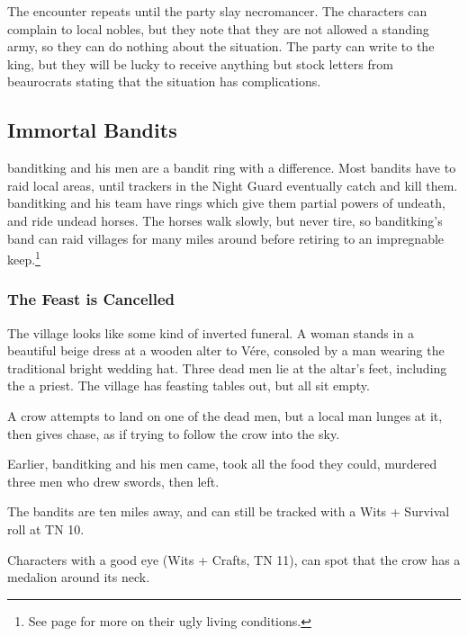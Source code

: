 The encounter repeats until the party slay \gls{necromancer}.  The characters can complain to local nobles, but they note that they are not allowed a standing army, so they can do nothing about the situation.  The party can write to the king, but they will be lucky to receive anything but stock letters from beaurocrats stating that the situation has complications.

\subsection[Immortal Bandits]{Immortal Bandits}\label{immortalbandits}

\Gls{banditking} and his men are a bandit ring with a difference.  Most bandits have to raid local areas, until trackers in the Night Guard eventually catch and kill them.  \gls{banditking} and his team have rings which give them partial powers of undeath, and ride undead horses.  The horses walk slowly, but never tire, so \gls{banditking}'s band can raid villages for many miles around before retiring to an impregnable keep.\footnote{See page \pageref{necromancers_lair} for more on their ugly living conditions.}

\subsubsection{The Feast is Cancelled}

\begin{boxtext}

	The village looks like some kind of inverted funeral.  A woman stands in a beautiful beige dress at a wooden alter to V\'{e}re, consoled by a man wearing the traditional bright wedding hat.  Three dead men lie at the altar's feet, including the a priest.  The village has feasting tables out, but all sit empty.

	A crow attempts to land on one of the dead men, but a local man lunges at it, then gives chase, as if trying to follow the crow into the sky.

\end{boxtext}

Earlier, \gls{banditking} and his men came, took all the food they could, murdered three men who drew swords, then left.

The bandits are ten miles away, and can still be tracked with a Wits + Survival roll at TN 10.

Characters with a good eye (Wits + Crafts, TN 11), can spot that the crow has a medalion around its neck.

